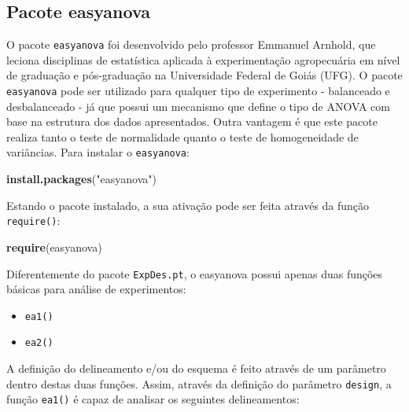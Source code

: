 \documentclass[
]{article}
\newenvironment{Shaded}{\begin{snugshade}}{\end{snugshade}}
\newcommand{\KeywordTok}[1]{\textcolor[rgb]{0.13,0.29,0.53}{\textbf{#1}}}
\newcommand{\NormalTok}[1]{#1}
\newcommand{\StringTok}[1]{\textcolor[rgb]{0.31,0.60,0.02}{#1}}
\providecommand{\tightlist}{%
  \setlength{\itemsep}{0pt}\setlength{\parskip}{0pt}}
\begin{document}
\hypertarget{pacote-easyanova}{%
\subsection{Pacote easyanova}\label{pacote-easyanova}}

O pacote \texttt{easyanova} foi desenvolvido pelo professor Emmanuel Arnhold, que leciona disciplinas de estatística aplicada à experimentação agropecuária em nível de graduação e pós-graduação na Universidade Federal de Goiás (UFG). O pacote \texttt{easyanova} pode ser utilizado para qualquer tipo de experimento - balanceado e desbalanceado - já que possui um mecanismo que define o tipo de ANOVA com base na estrutura dos dados apresentados. Outra vantagem é que este pacote realiza tanto o teste de normalidade quanto o teste de homogeneidade de variâncias. Para instalar o \texttt{easyanova}:

\begin{Shaded}
\begin{Highlighting}[]
\KeywordTok{install.packages}\NormalTok{(}\StringTok{"easyanova"}\NormalTok{)}
\end{Highlighting}
\end{Shaded}

Estando o pacote instalado, a sua ativação pode ser feita através da função \texttt{require()}:

\begin{Shaded}
\begin{Highlighting}[]
\KeywordTok{require}\NormalTok{(easyanova)}
\end{Highlighting}
\end{Shaded}

Diferentemente do pacote \texttt{ExpDes.pt}, o easyanova possui apenas duas funções básicas para análise de experimentos:

\begin{itemize}
\tightlist
\item
  \texttt{ea1()}
\item
  \texttt{ea2()}
\end{itemize}

A definição do delineamento e/ou do esquema é feito através de um parâmetro dentro destas duas funções. Assim, através da definição do parâmetro \texttt{design}, a função \texttt{ea1()} é capaz de analisar os seguintes delineamentos:
\end{document}

